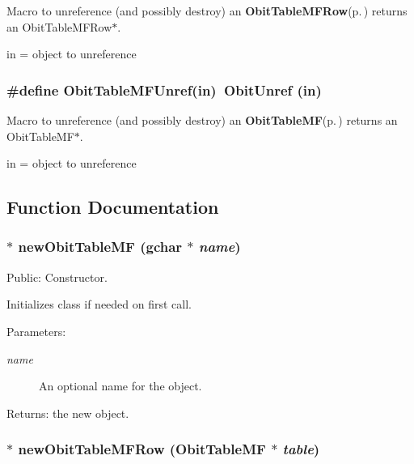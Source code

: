 Macro to unreference (and possibly destroy) an {\bf Obit\-Table\-MFRow}{\rm (p.\,\pageref{structObitTableMFRow})} returns an Obit\-Table\-MFRow$\ast$. 

in = object to unreference 
\subsubsection{\setlength{\rightskip}{0pt plus 5cm}\#define Obit\-Table\-MFUnref(in)\ Obit\-Unref (in)}\label{ObitTableMF_8h_a1}


Macro to unreference (and possibly destroy) an {\bf Obit\-Table\-MF}{\rm (p.\,\pageref{structObitTableMF})} returns an Obit\-Table\-MF$\ast$. 

in = object to unreference 

\subsection{Function Documentation}
\subsubsection{$\ast$ new\-Obit\-Table\-MF (gchar $\ast$ {\em name})}\label{ObitTableMF_8h_a11}


Public: Constructor. 

Initializes class if needed on first call. \begin{Desc}
\item[Parameters:]
\begin{description}
\item[{\em name}]An optional name for the object. \end{description}
\end{Desc}
\begin{Desc}
\item[Returns:]the new object. \end{Desc}
\subsubsection{$\ast$ new\-Obit\-Table\-MFRow ({\bf Obit\-Table\-MF} $\ast$ {\em table})}\label{ObitTableMF_8h_a8}


